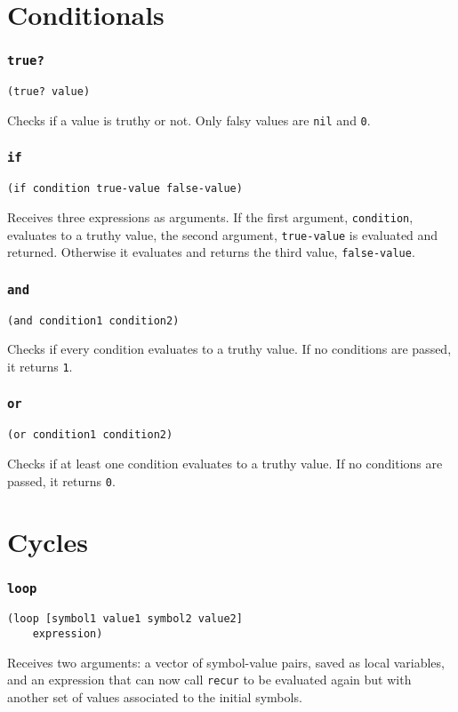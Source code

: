 \documentclass[11pt]{scrreprt}
\begin{document}
\section{Conditionals}
\subsubsection{\texttt{true?}}
\begin{verbatim}
(true? value)
\end{verbatim}
Checks if a value is truthy or not. Only falsy values are \texttt{nil} and \texttt{0}.

\subsubsection{\texttt{if}}
\begin{verbatim}
(if condition true-value false-value)
\end{verbatim}
Receives three expressions as arguments. If the first argument, \texttt{condition}, evaluates to a truthy value, the second argument, \texttt{true-value} is evaluated and returned. Otherwise it evaluates and returns the third value, \texttt{false-value}.

\subsubsection{\texttt{and}}
\begin{verbatim}
(and condition1 condition2)
\end{verbatim}
Checks if every condition evaluates to a truthy value. If no conditions are passed, it returns \texttt{1}.

\subsubsection{\texttt{or}}
\begin{verbatim}
(or condition1 condition2)
\end{verbatim}
Checks if at least one condition evaluates to a truthy value. If no conditions are passed, it returns \texttt{0}.

\section{Cycles}
\subsubsection{\texttt{loop}}
\begin{verbatim}
(loop [symbol1 value1 symbol2 value2]
    expression)
\end{verbatim}
Receives two arguments: a vector of symbol-value pairs, saved as local variables, and an expression that can now call \texttt{recur} to be evaluated again but with another set of values associated to the initial symbols.
\end{document}
